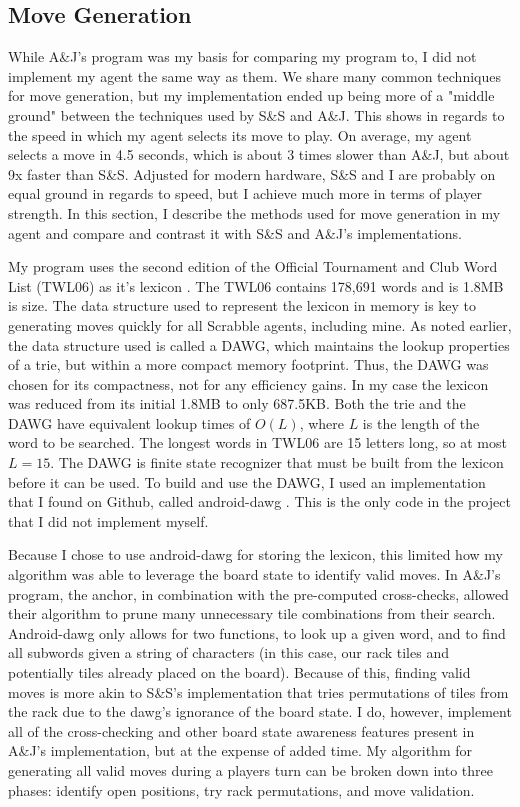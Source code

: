 \documentclass[letterpaper]{article}
\begin{document}
\subsection{Move Generation}
While A\&J's program was my basis for comparing my program to, I did not implement my agent the same way as them. We share many common techniques for move generation, but my implementation ended up being more of a "middle ground" between the techniques used by S\&S and A\&J. This shows in regards to the speed in which my agent selects its move to play. On average, my agent selects a move in 4.5 seconds, which is about 3 times slower than A\&J, but about 9x faster than S\&S. Adjusted for modern hardware, S\&S and I are probably on equal ground in regards to speed, but I achieve much more in terms of player strength. In this section, I describe the methods used for move generation in my agent and compare and contrast it with S\&S and A\&J's implementations.

My program uses the second edition of the Official Tournament and Club Word List (TWL06) as it's lexicon \cite{naspa}. The TWL06 contains 178,691 words and is 1.8MB is size. The data structure used to represent the lexicon in memory is key to generating moves quickly for all Scrabble agents, including mine. As noted earlier, the data structure used is called a DAWG, which maintains the lookup properties of a trie, but within a more compact memory footprint. Thus, the DAWG was chosen for its compactness, not for any efficiency gains. In my case the lexicon was reduced from its initial 1.8MB to only 687.5KB. Both the trie and the DAWG have equivalent lookup times of $O(L)$, where $L$ is the length of the word to be searched. The longest words in TWL06 are 15 letters long, so at most $L=15$. The DAWG is finite state recognizer that must be built from the lexicon before it can be used. To build and use the DAWG, I used an implementation that I found on Github, called android-dawg \cite{icantrap}. This is the only code in the project that I did not implement myself.

Because I chose to use android-dawg for storing the lexicon, this limited how my algorithm was able to leverage the board state to identify valid moves. In A\&J's program, the anchor, in combination with the pre-computed cross-checks, allowed their algorithm to prune many unnecessary tile combinations from their search. Android-dawg only allows for two functions, to look up a given word, and to find all subwords given a string of characters (in this case, our rack tiles and potentially tiles already placed on the board). Because of this, finding valid moves is more akin to S\&S's implementation that tries permutations of tiles from the rack due to the dawg's ignorance of the board state. I do, however, implement all of the cross-checking and other board state awareness features present in A\&J's implementation, but at the expense of added time. My algorithm for generating all valid moves during a players turn can be broken down into three phases: identify open positions, try rack permutations, and move validation.
\end{document}
